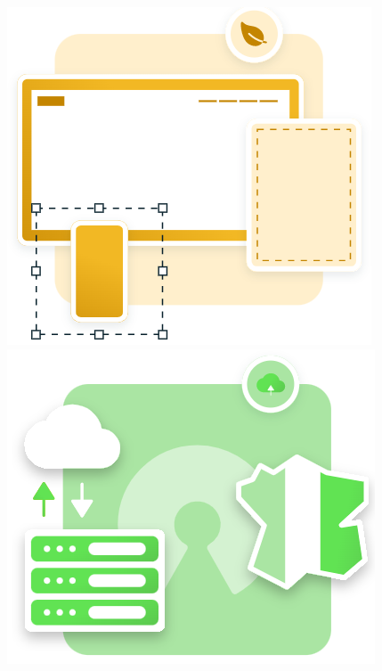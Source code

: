 \documentclass[12pt, a4paper, twoside]{article}
\begin{document}
\begin{figure}[!ht]
    \noindent%
    \begin{minipage}{.25\textwidth}%
        \begin{center}
            \includegraphics[scale=0.4]{src/logo_developpemnt_sur_mesure.png}
        \end{center}
    \end{minipage}%
    \hfill
    \begin{minipage}{.25\textwidth}%
        \begin{center}
            \includegraphics[scale=0.4]{src/logo_hebergement.png}
        \end{center}
    \end{minipage}%
    \noindent%
\begin{minipage}{.25\textwidth}%

\end{minipage}
\end{figure}
\end{document}

